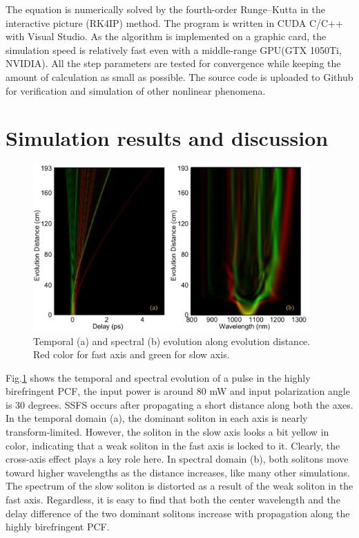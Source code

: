 \documentclass{osa-article}
\begin{document}
The equation is numerically solved by the fourth-order Runge--Kutta in the interactive picture (RK4IP)\cite{Hult2007} method. The program is written in CUDA C/C++ with Visual Studio. As the algorithm is implemented on a graphic card, the simulation speed is relatively fast even with a middle-range GPU(GTX 1050Ti, NVIDIA). All the step parameters are tested for convergence while keeping the amount of calculation as small as possible. The source code is uploaded to Github for verification and simulation of other nonlinear phenomena.


\section{Simulation results and discussion}

\begin{figure}[htbp]
    \centering%
    \includegraphics[width=300pt]{fig_propagation.pdf}
    \caption{Temporal (a) and spectral (b) evolution along evolution distance. Red color for fast axis and green for slow axis.}
    \label{fig_propagation}\vspace*{-6pt}
\end{figure}
 
Fig.\ref{fig_propagation} shows the temporal and spectral evolution of a pulse in the highly birefringent PCF, the input power is around 80 mW and input polarization angle is 30 degrees. SSFS occurs after propagating a short distance along both the axes. In the temporal domain (a), the dominant soliton in each axis is nearly transform-limited. However, the soliton in the slow axis looks a bit yellow in color, indicating that a weak soliton in the fast axis is locked to it. Clearly, the cross-axis effect plays a key role here. In spectral domain (b), both solitons move toward higher wavelengths as the distance increases, like many other simulations\cite{dudley_supercontinuum_2006}. The spectrum of the slow soliton is distorted as a result of the weak soliton in the fast axis. Regardless, it is easy to find that both the center wavelength and the delay difference of the two dominant solitons increase with propagation along the highly birefringent PCF.
\end{document}
